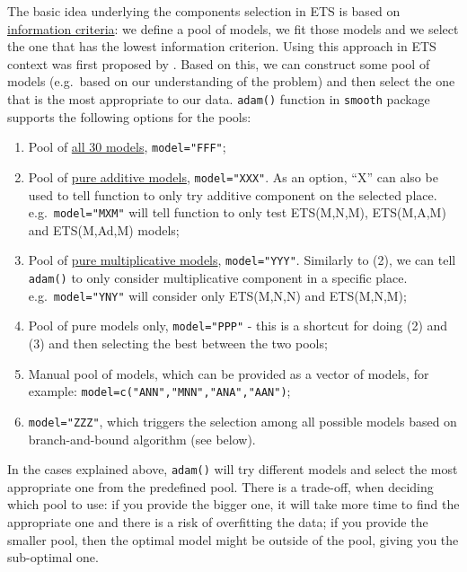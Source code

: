 \documentclass[
]{book}
\providecommand{\tightlist}{%
  \setlength{\itemsep}{0pt}\setlength{\parskip}{0pt}}
\theoremstyle{definition}
\theoremstyle{definition}
\theoremstyle{definition}
\theoremstyle{definition}
\theoremstyle{remark}
\begin{document}
The basic idea underlying the components selection in ETS is based on \protect\hyperlink{informationCriteria}{information criteria}: we define a pool of models, we fit those models and we select the one that has the lowest information criterion. Using this approach in ETS context was first proposed by \citet{Hyndman2002}. Based on this, we can construct some pool of models (e.g.~based on our understanding of the problem) and then select the one that is the most appropriate to our data. \texttt{adam()} function in \texttt{smooth} package supports the following options for the pools:

\begin{enumerate}
\def\labelenumi{\arabic{enumi}.}
\tightlist
\item
  Pool of \protect\hyperlink{ETSTaxonomy}{all 30 models}, \texttt{model="FFF"};
\item
  Pool of \protect\hyperlink{ADAMETSPureAdditive}{pure additive models}, \texttt{model="XXX"}. As an option, ``X'' can also be used to tell function to only try additive component on the selected place. e.g.~\texttt{model="MXM"} will tell function to only test ETS(M,N,M), ETS(M,A,M) and ETS(M,Ad,M) models;
\item
  Pool of \protect\hyperlink{ADAMETSPureMultiplicative}{pure multiplicative models}, \texttt{model="YYY"}. Similarly to (2), we can tell \texttt{adam()} to only consider multiplicative component in a specific place. e.g.~\texttt{model="YNY"} will consider only ETS(M,N,N) and ETS(M,N,M);
\item
  Pool of pure models only, \texttt{model="PPP"} - this is a shortcut for doing (2) and (3) and then selecting the best between the two pools;
\item
  Manual pool of models, which can be provided as a vector of models, for example: \texttt{model=c("ANN","MNN","ANA","AAN")};
\item
  \texttt{model="ZZZ"}, which triggers the selection among all possible models based on branch-and-bound algorithm (see below).
\end{enumerate}

In the cases explained above, \texttt{adam()} will try different models and select the most appropriate one from the predefined pool. There is a trade-off, when deciding which pool to use: if you provide the bigger one, it will take more time to find the appropriate one and there is a risk of overfitting the data; if you provide the smaller pool, then the optimal model might be outside of the pool, giving you the sub-optimal one.
\end{document}
